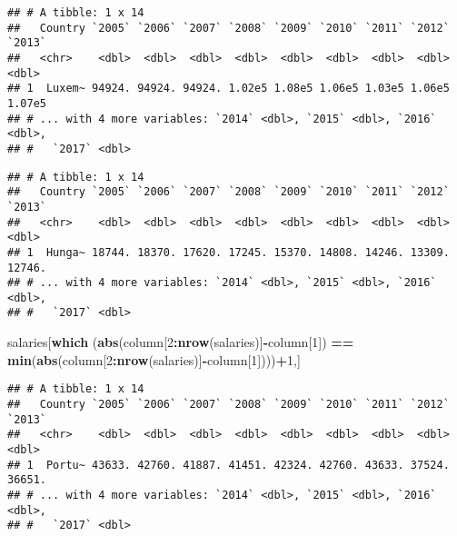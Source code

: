 \documentclass[]{article}
\newenvironment{Shaded}{\begin{snugshade}}{\end{snugshade}}
\newcommand{\KeywordTok}[1]{\textcolor[rgb]{0.13,0.29,0.53}{\textbf{#1}}}
\newcommand{\DataTypeTok}[1]{\textcolor[rgb]{0.13,0.29,0.53}{#1}}
\newcommand{\DecValTok}[1]{\textcolor[rgb]{0.00,0.00,0.81}{#1}}
\newcommand{\StringTok}[1]{\textcolor[rgb]{0.31,0.60,0.02}{#1}}
\newcommand{\OperatorTok}[1]{\textcolor[rgb]{0.81,0.36,0.00}{\textbf{#1}}}
\newcommand{\NormalTok}[1]{#1}
\begin{document}
\begin{verbatim}
## # A tibble: 1 x 14
##   Country `2005` `2006` `2007` `2008` `2009` `2010` `2011` `2012` `2013`
##   <chr>    <dbl>  <dbl>  <dbl>  <dbl>  <dbl>  <dbl>  <dbl>  <dbl>  <dbl>
## 1  Luxem~ 94924. 94924. 94924. 1.02e5 1.08e5 1.06e5 1.03e5 1.06e5 1.07e5
## # ... with 4 more variables: `2014` <dbl>, `2015` <dbl>, `2016` <dbl>,
## #   `2017` <dbl>
\end{verbatim}

\begin{Shaded}
\end{Shaded}

\begin{verbatim}
## # A tibble: 1 x 14
##   Country `2005` `2006` `2007` `2008` `2009` `2010` `2011` `2012` `2013`
##   <chr>    <dbl>  <dbl>  <dbl>  <dbl>  <dbl>  <dbl>  <dbl>  <dbl>  <dbl>
## 1  Hunga~ 18744. 18370. 17620. 17245. 15370. 14808. 14246. 13309. 12746.
## # ... with 4 more variables: `2014` <dbl>, `2015` <dbl>, `2016` <dbl>,
## #   `2017` <dbl>
\end{verbatim}

\begin{Shaded}
\begin{Highlighting}[]
\NormalTok{salaries[}\KeywordTok{which}\NormalTok{ (}\KeywordTok{abs}\NormalTok{(column[}\DecValTok{2}\OperatorTok{:}\KeywordTok{nrow}\NormalTok{(salaries)]}\OperatorTok{-}\NormalTok{column[}\DecValTok{1}\NormalTok{]) }\OperatorTok{==}\StringTok{ }\KeywordTok{min}\NormalTok{(}\KeywordTok{abs}\NormalTok{(column[}\DecValTok{2}\OperatorTok{:}\KeywordTok{nrow}\NormalTok{(salaries)]}\OperatorTok{-}\NormalTok{column[}\DecValTok{1}\NormalTok{])))}\OperatorTok{+}\DecValTok{1}\NormalTok{,]}
\end{Highlighting}
\end{Shaded}

\begin{verbatim}
## # A tibble: 1 x 14
##   Country `2005` `2006` `2007` `2008` `2009` `2010` `2011` `2012` `2013`
##   <chr>    <dbl>  <dbl>  <dbl>  <dbl>  <dbl>  <dbl>  <dbl>  <dbl>  <dbl>
## 1  Portu~ 43633. 42760. 41887. 41451. 42324. 42760. 43633. 37524. 36651.
## # ... with 4 more variables: `2014` <dbl>, `2015` <dbl>, `2016` <dbl>,
## #   `2017` <dbl>
\end{verbatim}
\end{document}
